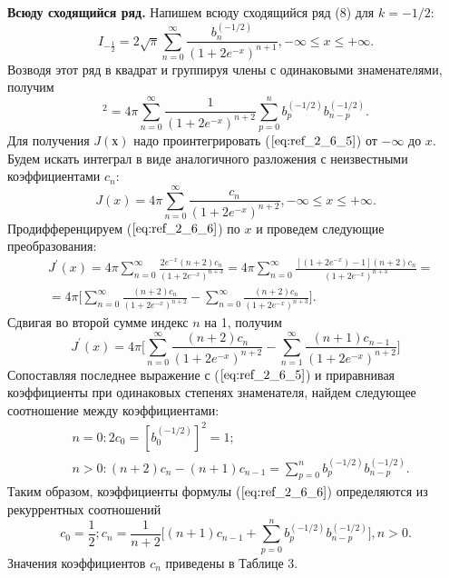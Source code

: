 \textbf{Всюду сходящийся ряд.} Напишем всюду сходящийся ряд (8) для $k = -1/2$:
\begin{equation}
I_{-\frac{1}{2}} = 2\sqrt{\pi} \sum\limits_{n=0}^{\infty} \frac{b_n^{(-1/2)}}{(1+2e^{-x})^{n+1}}, -\infty \leqslant x \leqslant +\infty.
\label{eq:ref_2_6_4}
\end{equation}
Возводя этот ряд в квадрат и группируя члены с одинаковыми знаменателями, получим
\begin{equation}
[I_{-\frac{1}{2}}]^2 = 4\pi \sum\limits_{n=0}^{\infty} \frac{1}{(1+2e^{-x})^{n+2}} \sum\limits_{p=0}^n b_p^{(-1/2)} b_{n-p}^{(-1/2)}.
\label{eq:ref_2_6_5}
\end{equation}
Для получения $J(х)$ надо проинтегрировать ($\ref{eq:ref_2_6_5}$) от $-\infty$ до $x$. Будем искать
интеграл в виде аналогичного разложения с неизвестными коэффициентами $c_n$:
\begin{equation}
J(x)=4\pi \sum_{n=0}^{\infty} \frac{c_n}{(1+2e^{-x})^{n+2}}, -\infty \leqslant x \leqslant +\infty.
\label{eq:ref_2_6_6}
\end{equation}
Продифференцируем ($\ref{eq:ref_2_6_6}$) по $x$ и проведем следующие преобразования:
\begin{equation}
\begin{aligned}
&J^{'}(x) = 4\pi \sum\limits_{n=0}^{\infty} \frac{2e^{-x}(n+2)c_n}{(1+2e^{-x})^{n+3}} = 4\pi \sum\limits_{n=0}^{\infty} \frac{[(1+2e^{-x}) - 1](n+2)c_n}{(1+2e^{-x})^{n+3}} = \\
&= 4\pi \Bigg[ \sum\limits_{n=0}^{\infty} \frac{(n+2)c_n}{(1+2e^{-x})^{n+2}} - \sum\limits_{n=0}^{\infty} \frac{(n+2)c_n}{(1+2e^{-x})^{n+3}} \Bigg].
\end{aligned}
\label{eq:ref_2_6_7}
\end{equation}
Сдвигая во второй сумме индекс $n$ на 1, получим
\begin{equation}
J^{'}(x) = 4\pi \Bigg[ \sum\limits_{n=0}^{\infty} \frac{(n+2)c_n}{(1+2e^{-x})^{n+2}} - \sum\limits_{n=1}^{\infty} \frac{(n+1)c_{n-1}}{(1+2e^{-x})^{n+2}}\Bigg]
\label{eq:ref_2_6_8}
\end{equation}
Сопоставляя последнее выражение с ($\ref{eq:ref_2_6_5}$) и приравнивая коэффициенты при
одинаковых степенях знаменателя, найдем следующее соотношение между
коэффициентами:
\begin{equation}
\begin{aligned}
&n=0: 2c_0 = [b_0^{(-1/2)}]^2 = 1;\\
&n>0: (n+2)c_n - (n+1)c_{n-1} = \sum\limits_{p=0}^n b_p^{(-1/2)}b_{n-p}^{(-1/2)}.
\end{aligned}
\label{eq:ref_2_6_9}
\end{equation}
Таким образом, коэффициенты формулы ($\ref{eq:ref_2_6_6}$) определяются из рекуррентных соотношений
\begin{equation}
c_0 = \frac{1}{2}; c_n = \frac{1}{n+2} \Bigg[ (n+1)c_{n-1} + \sum\limits_{p=0}^n b_p^{(-1/2)}b_{n-p}^{(-1/2)} \Bigg], n > 0.
\label{eq:ref_2_6_10}
\end{equation}
Значения коэффициентов $c_n$ приведены в Таблице 3.

